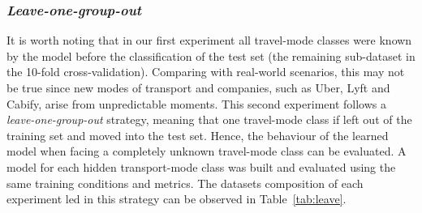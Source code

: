 \subsubsection{\emph{Leave-one-group-out}}\label{subsec:leave_one_group_out}

It is worth noting that in our first experiment all travel-mode classes were known by the model before the classification of the test set (the remaining sub-dataset in the 10-fold cross-validation). Comparing with real-world scenarios, this may not be true since new modes of transport and companies, such as Uber, Lyft and Cabify, arise from unpredictable moments. This second experiment follows a \emph{leave-one-group-out} strategy, meaning that one travel-mode class if left out of the training set and moved into the test set. Hence, the behaviour of the learned model when facing a completely unknown travel-mode class can be evaluated. A model for each hidden transport-mode class was built and evaluated using the same training conditions and metrics. The datasets composition of each experiment led in this strategy can be observed in Table~\ref{tab:leave}.

